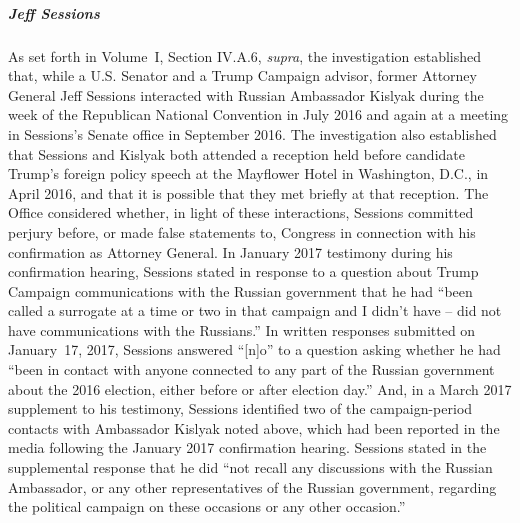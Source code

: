 

\subparagraph{Jeff Sessions}
As set forth in Volume~I, Section IV.A.6, \textit{supra}, the investigation established that, while a U.S. Senator and a Trump Campaign advisor, former Attorney General Jeff Sessions interacted with Russian Ambassador Kislyak during the week of the Republican National Convention in July 2016 and again at a meeting in Sessions's Senate office in September 2016.
The investigation also established that Sessions and Kislyak both attended a reception held before candidate Trump's foreign policy speech at the Mayflower Hotel in Washington, D.C., in April 2016, and that it is possible that they met briefly at that reception.
The Office considered whether, in light of these interactions, Sessions committed perjury before, or made false statements to, Congress in connection with his confirmation as Attorney General.
In January 2017 testimony during his confirmation hearing, Sessions stated in response to a question about Trump Campaign communications with the Russian government that he had ``been called a surrogate at a time or two in that campaign and I didn't have -- did not have communications with the Russians.''
In written responses submitted on January~17, 2017, Sessions answered ``[n]o'' to a question asking whether he had ``been in contact with anyone connected to any part of the Russian government about the 2016 election, either before or after election day.''
And, in a March 2017 supplement to his testimony, Sessions identified two of the campaign-period contacts with Ambassador Kislyak noted above, which had been reported in the media following the January 2017 confirmation hearing.
Sessions stated in the supplemental response that he did ``not recall any discussions with the Russian Ambassador, or any other representatives of the Russian government, regarding the political campaign on these occasions or any other occasion.''

